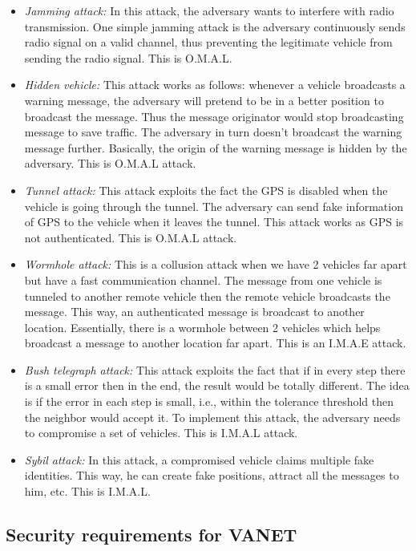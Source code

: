 \documentclass{IEEEtran}
\begin{document}
\begin{itemize}
\item \emph{Jamming attack:} In this attack, the adversary wants to interfere with radio transmission. One simple jamming attack is the adversary continuously sends radio signal on a valid channel, thus preventing the legitimate vehicle from sending the radio signal. This is O.M.A.L.
\item \emph{Hidden vehicle:} This attack works as follows: whenever a vehicle broadcasts a warning message, the adversary will pretend to be in a better position to broadcast the message. Thus the message originator would stop broadcasting message to save traffic. The adversary in turn doesn’t broadcast the warning message further. Basically, the origin of the warning message is hidden by the adversary. This is O.M.A.L attack.
\item \emph{Tunnel attack:} This attack exploits the fact the GPS is disabled when the vehicle is going through the tunnel. The adversary can send fake information of GPS to the vehicle when it leaves the tunnel. This attack works as GPS is not authenticated. This is O.M.A.L attack.
\item \emph{Wormhole attack:} This is a collusion attack when we have 2 vehicles far apart but have a fast communication channel. The message from one vehicle is tunneled to another remote vehicle then the remote vehicle broadcasts the message. This way, an authenticated message is broadcast to another location. Essentially, there is a wormhole between 2 vehicles which helps broadcast a message to another location far apart. This is an I.M.A.E attack.
\item \emph{Bush telegraph attack:} This attack exploits the fact that if in every step there is a small error then in the end, the result would be totally different. The idea is if the error in each step is small, i.e., within the tolerance threshold then the neighbor would accept it. To implement this attack, the adversary needs to compromise a set of vehicles. This is I.M.A.L attack.
\item \emph{Sybil attack:} In this attack, a compromised vehicle claims multiple fake identities. This way, he can create fake positions, attract all the messages to him, etc. This is I.M.A.L.
\end{itemize}

\subsection{Security requirements for VANET}
\end{document}
